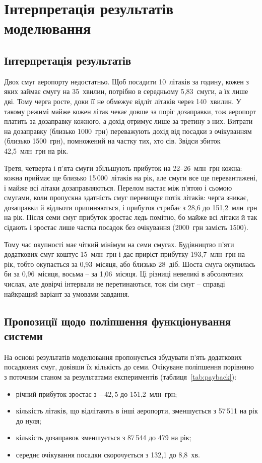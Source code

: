 \section{Інтерпретація результатів моделювання}

\subsection{Інтерпретація результатів}

Двох смуг аеропорту недостатньо. Щоб посадити 10~літаків за годину, кожен з яких займає смугу на 35~хвилин, потрібно в середньому 5,83~смуги, а їх лише дві. Тому черга росте, доки її не обмежує відліт літаків через 140~хвилин. У такому режимі майже кожен літак чекає довше за поріг дозаправки, тож аеропорт платить за дозаправку кожного, а дохід отримує лише за третину з них. Витрати на дозаправку (близько 1000~грн) переважують дохід від посадки з очікуванням (близько 1500~грн), помножений на частку тих, хто сів. Звідси збиток 42,5~млн~грн на рік.

Третя, четверта і п'ята смуги збільшують прибуток на 22--26~млн~грн кожна: кожна приймає ще близько 15\,000~літаків на рік, але смуги все ще перевантажені, і майже всі літаки дозаправляються. Перелом настає між п'ятою і сьомою смугами, коли пропускна здатність смуг перевищує потік літаків: черга зникає, дозаправки й відльоти припиняються, і прибуток стрибає з 28,6 до 151,2~млн~грн на рік. Після семи смуг прибуток зростає ледь помітно, бо майже всі літаки й так сідають і зростає лише частка посадок без очікування (2000~грн замість 1500).

Тому час окупності має чіткий мінімум на семи смугах. Будівництво п'яти додаткових смуг коштує 15~млн~грн і дає приріст прибутку 193,7~млн~грн на рік, тобто окупається за 0,93~місяця, або близько 28~діб. Шоста смуга окупилась би за 0,96~місяця, восьма -- за 1,06~місяця. Ці різниці невеликі в абсолютних числах, але довірчі інтервали не перетинаються, тож сім смуг -- справді найкращий варіант за умовами завдання.

\subsection{Пропозиції щодо поліпшення функціонування системи}

На основі результатів моделювання пропонується збудувати п'ять додаткових посадкових смуг, довівши їх кількість до семи. Очікуване поліпшення порівняно з поточним станом за результатами експериментів (таблиця~\ref{tab:payback}):
\begin{itemize}
\item річний прибуток зростає з $-42{,}5$ до 151,2~млн~грн;
\item кількість літаків, що відлітають в інші аеропорти, зменшується з 57\,511 на рік до нуля;
\item кількість дозаправок зменшується з 87\,544 до 479 на рік;
\item середнє очікування посадки скорочується з 132,1 до 8,8~хв.
\end{itemize}

